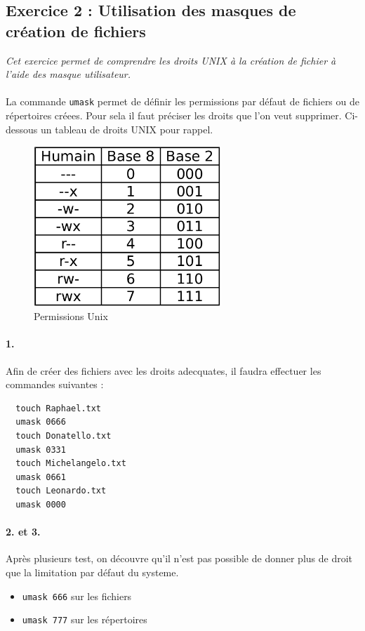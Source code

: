 \subsection{Exercice 2 : Utilisation des masques de création de fichiers}
\textit{Cet exercice permet de comprendre les droits UNIX à la création de fichier à l'aide des masque utilisateur.}
\\\\
La commande \texttt{umask} permet de définir les permissions par défaut de fichiers ou de répertoires  créees. Pour sela il faut préciser les droits que l'on veut supprimer.
Ci-dessous un tableau de droits UNIX pour rappel.

\begin{figure}[H]
  \centering
  \includegraphics[width=200pt]{./shell/Pictures/permissions}
  \caption{Permissions Unix}
  \label{Permissions Unix}
\end{figure}

\paragraph{1.}
Afin de créer des fichiers avec les droits adecquates, il faudra effectuer les commandes suivantes :
\begin{verbatim}
  touch Raphael.txt
  umask 0666
  touch Donatello.txt
  umask 0331
  touch Michelangelo.txt
  umask 0661
  touch Leonardo.txt
  umask 0000
\end{verbatim}

\paragraph{2. et 3.}
Après plusieurs test, on découvre qu'il n'est pas possible de donner plus de droit que la limitation par défaut du systeme.
\begin{itemize}
\item \texttt{umask 666} sur les fichiers
\item \texttt{umask 777} sur les répertoires
\end{itemize}

